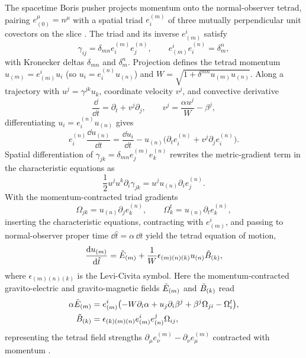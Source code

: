 The spacetime Boris pusher projects momentum onto the normal-observer tetrad, pairing $e_{(0)}^\mu = n^\mu$ with a spatial triad $e^{(m)}_i$ of three mutually perpendicular unit covectors on the slice \cite{Olivares:2021cfa,Boyeneni:2025tsx,Wu:2026nrpic}. The triad and its inverse $e^i_{(m)}$ satisfy
\begin{equation}\label{eq:triad_def}
\gamma_{ij} = \delta_{mn} e^{(m)}_i e^{(n)}_j, \qquad
e^i_{(m)} e^{(n)}_i = \delta^n_m,
\end{equation}
with Kronecker deltas $\delta_{mn}$ and $\delta^n_m$. Projection defines the tetrad momentum $u_{(m)} = e^i_{(m)} u_i$ (so $u_i = e^{(n)}_i u_{(n)}$) and $W = \sqrt{1 + \delta^{mn} u_{(m)} u_{(n)}}$. Along a trajectory with $u^j = \gamma^{jk} u_k$, coordinate velocity $v^j$, and convective derivative
\begin{equation}\label{eq:coord_vel}
\frac{\dd}{\dd t} = \partial_t + v^j \partial_j, \qquad
v^j = \frac{\alpha u^j}{W} - \beta^j,
\end{equation}
differentiating $u_i = e^{(n)}_i u_{(n)}$ gives
\begin{equation}\label{eq:triad_chain}
e^{(n)}_i \frac{\dd u_{(n)}}{\dd t} = \frac{\dd u_i}{\dd t} - u_{(n)}\bigl(\partial_t e^{(n)}_i + v^j \partial_j e^{(n)}_i\bigr).
\end{equation}
Spatial differentiation of $\gamma_{jk} = \delta_{mn} e^{(m)}_j e^{(n)}_k$ rewrites the metric-gradient term in the characteristic equations as
\begin{equation}\label{eq:metric_triad_id}
\frac{1}{2} u^j u^k \partial_i \gamma_{jk} = u^j u_{(n)} \partial_i e^{(n)}_j.
\end{equation}
With the momentum-contracted triad gradients
\begin{equation}\label{eq:triad_gradients}
\Omega_{jk} = u_{(n)} \partial_j e^{(n)}_k, \qquad
\Omega^t_k = u_{(n)} \partial_t e^{(n)}_k,
\end{equation}
inserting the characteristic equations, contracting with $e^i_{(m)}$, and passing to normal-observer proper time $\dd\hat{t} = \alpha\,\dd t$ yield the tetrad equation of motion,
\begin{equation}\label{eq:tetrad_eom}
\frac{\mathrm{d} u_{(m)}}{\mathrm{d}\hat{t}} = \tilde{E}_{(m)} + \frac{1}{W}\epsilon_{(m)(n)(k)} u_{(n)} \tilde{B}_{(k)},
\end{equation}
where $\epsilon_{(m)(n)(k)}$ is the Levi-Civita symbol. Here the momentum-contracted gravito-electric and gravito-magnetic fields $\tilde{E}_{(m)}$ and $\tilde{B}_{(k)}$ read
\begin{align}\label{eq:gravito_em}
\alpha \tilde{E}_{(m)} &= e^i_{(m)}\bigl(-W\partial_i\alpha + u_j\partial_i\beta^j + \beta^j \Omega_{ji} - \Omega^t_i\bigr), \nonumber\\
\tilde{B}_{(k)} &= \epsilon_{(k)(m)(n)} e^i_{(m)} e^j_{(n)} \Omega_{ij},
\end{align}
representing the tetrad field strengths $\partial_\mu e^{(m)}_\nu - \partial_\nu e^{(m)}_\mu$ contracted with momentum \cite{Olivares:2021cfa,Boyeneni:2025tsx}.

